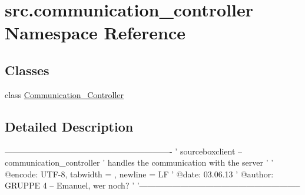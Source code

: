 \hypertarget{namespacesrc_1_1communication__controller}{\section{src.\-communication\-\_\-controller Namespace Reference}
\label{namespacesrc_1_1communication__controller}
}
\subsection*{Classes}
\begin{DoxyCompactItemize}
\item 
class \hyperlink{classsrc_1_1communication__controller_1_1_communication___controller}{Communication\-\_\-\-Controller}
\end{DoxyCompactItemize}


\subsection{Detailed Description}
\begin{DoxyVerb}-------------------------------------------------------------
' sourceboxclient – communication_controller
' handles the communication with the server
'
' @encode:  UTF-8, tabwidth = , newline = LF
' @date:    03.06.13
' @author:  GRUPPE 4 – Emanuel, wer noch?
'
'----------------------------------------------------------- \end{DoxyVerb}
 